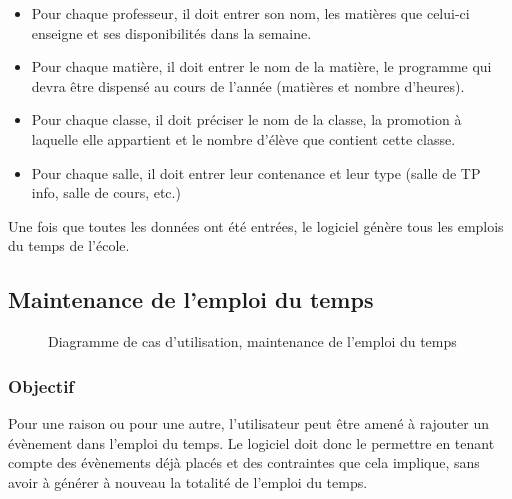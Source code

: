 \documentclass[12pt,a4paper,french]{article}
\begin{document}
\begin{itemize}
\item Pour chaque professeur, il doit entrer son nom, les matières que celui-ci enseigne et ses disponibilités dans la semaine. 
\item Pour chaque matière, il doit entrer le nom de la matière, le programme qui devra être dispensé au cours de l'année (matières et nombre d'heures).
\item Pour chaque classe, il doit préciser le nom de la classe, la promotion à laquelle elle appartient et le nombre d'élève que contient cette classe.
\item Pour chaque salle, il doit entrer leur contenance et leur type (salle de TP info, salle de cours, etc.)
\end{itemize}
                    
Une fois que toutes les données ont été entrées, le logiciel génère tous les emplois du temps de l'école. 
        
\newpage
\subsection{Maintenance de l'emploi du temps}    
\begin{figure}[! ht ]
    \centering
    \begin{minipage}[t]{14 cm}
        \centering
        \caption {Diagramme de cas d'utilisation, maintenance de l'emploi du temps}
    \end{minipage}
\end{figure}
            
\subsubsection{Objectif}
Pour une raison ou pour une autre, l'utilisateur peut être amené à rajouter un évènement dans l'emploi du temps. Le logiciel doit donc le permettre en tenant  compte des évènements déjà placés et des contraintes que cela implique, sans avoir à générer à nouveau la totalité de l'emploi du temps. 
                
\end{document}
